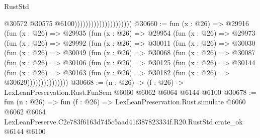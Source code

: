 \begin{lexlean}{RustStd}
\begin{coremodule}
                                              @30572
                                              @30575
                                              @6100)))))))))))))))))))))
@30660 := fun (x : @26) =>
  @29916
    (fun (x : @26) =>
    @29935
      (fun (x : @26) =>
      @29954
        (fun (x : @26) =>
        @29973
          (fun (x : @26) =>
          @29992
            (fun (x : @26) =>
            @30011
              (fun (x : @26) =>
              @30030
                (fun (x : @26) =>
                @30049
                  (fun (x : @26) =>
                  @30068
                    (fun (x : @26) =>
                    @30087
                      (fun (x : @26) =>
                      @30106
                        (fun (x : @26) =>
                        @30125
                          (fun (x : @26) =>
                          @30144
                            (fun (x : @26) =>
                            @30163 (fun (x : @26) => @30182 (fun (x : @26) => @30629)))))))))))))))
@30668 := (n : @26) -> (f : @26) -> LexLeanPreservation.Rust.FunSem @6060 @6062 @6064 @6144 @6100
@30678 := fun (n : @26) =>
  fun (f : @26) =>
  LexLeanPreservation.Rust.simulate
    @6060
    @6062
    @6064
    LexLeanPreserve.C2e783f6163d745c5aad41f387823334f.R20.RustStd.crate_ok
    @6144
    @6100
\end{coremodule}
\end{lexlean}
